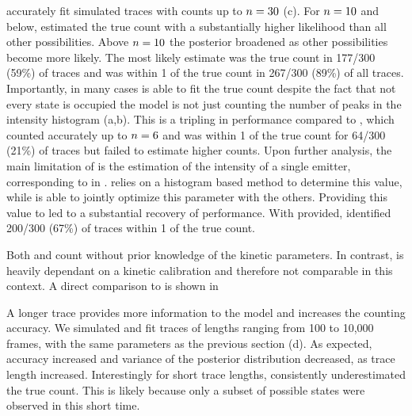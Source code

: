\ours accurately fit simulated traces with counts up to $n=30$ (c).
	For $n=10$ and below, \ours estimated the true count with a substantially 
	higher likelihood than all other possibilities. 
	Above $n=10$ the posterior broadened as other possibilities become more likely. 
	The most likely estimate was the true count in 177/300 (59\%) of traces and 
	was within 1 of the true count in 267/300 (89\%) of all traces.
	Importantly, in many cases \ours is able to fit the true count despite the fact that 
	not every state is occupied \ie the model is not just counting the 
	number of peaks in the intensity histogram (a,b).
	This is a tripling in performance compared to \lbfcs, which counted 
	accurately up to $n=6$ and was within 1 of the true count for 64/300 (21\%) of traces 
	but failed to estimate higher counts.
	Upon further analysis, the main limitation of \lbfcs is the estimation of the 
	intensity of a single emitter, corresponding to \re in \ours. 
	\lbfcs relies on a histogram based method to determine this value, while 
	\ours is able to jointly optimize this parameter with the others.
	Providing this value to \lbfcs led to a substantial recovery of performance.
	With \re provided, \lbfcs identified 200/300 (67\%) of traces within 1 of the true count. 

Both \ours and \lbfcs count without prior knowledge of the kinetic parameters.
	In contrast, \qpaint is heavily dependant on a kinetic calibration and 
	therefore not comparable in this context.
	A direct comparison to \qpaint is shown in 

A longer trace provides more
information to the model and increases the counting accuracy.
	We simulated and fit traces of lengths ranging from 100 to 10,000 frames, with the same parameters 
	as the previous section (d).
	As expected, accuracy increased and variance of the posterior distribution decreased, 
	as trace length increased.
	Interestingly for short trace lengths, \ours consistently underestimated the true count. 
	This is likely because only a subset of possible states were observed in this short time. %

